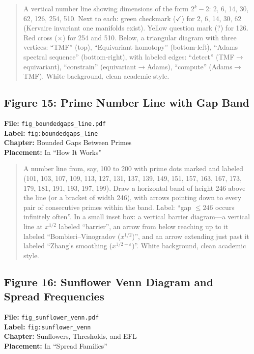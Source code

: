 \begin{quote}
A vertical number line showing dimensions of the form $2^k - 2$: 2, 6, 14, 30, 62, 126, 254, 510. Next to each: green checkmark ($\checkmark$) for 2, 6, 14, 30, 62 (Kervaire invariant one manifolds exist). Yellow question mark ($?$) for 126. Red cross ($\times$) for 254 and 510. Below, a triangular diagram with three vertices: ``TMF'' (top), ``Equivariant homotopy'' (bottom-left), ``Adams spectral sequence'' (bottom-right), with labeled edges: ``detect'' (TMF$\to$equivariant), ``constrain'' (equivariant$\to$Adams), ``compute'' (Adams$\to$TMF). White background, clean academic style.
\end{quote}

\subsection*{Figure 15: Prime Number Line with Gap Band}
\textbf{File:} \texttt{fig\_boundedgaps\_line.pdf} \\
\textbf{Label:} \texttt{fig:boundedgaps\_line} \\
\textbf{Chapter:} Bounded Gaps Between Primes \\
\textbf{Placement:} In ``How It Works''

\begin{quote}
A number line from, say, 100 to 200 with prime dots marked and labeled (101, 103, 107, 109, 113, 127, 131, 137, 139, 149, 151, 157, 163, 167, 173, 179, 181, 191, 193, 197, 199). Draw a horizontal band of height 246 above the line (or a bracket of width 246), with arrows pointing down to every pair of consecutive primes within the band. Label: ``gap $\leq 246$ occurs infinitely often''. In a small inset box: a vertical barrier diagram---a vertical line at $x^{1/2}$ labeled ``barrier'', an arrow from below reaching up to it labeled ``Bombieri--Vinogradov ($x^{1/2}$)'', and an arrow extending just past it labeled ``Zhang's smoothing ($x^{1/2+\varepsilon}$)''. White background, clean academic style.
\end{quote}

\subsection*{Figure 16: Sunflower Venn Diagram and Spread Frequencies}
\textbf{File:} \texttt{fig\_sunflower\_venn.pdf} \\
\textbf{Label:} \texttt{fig:sunflower\_venn} \\
\textbf{Chapter:} Sunflowers, Thresholds, and EFL \\
\textbf{Placement:} In ``Spread Families''

